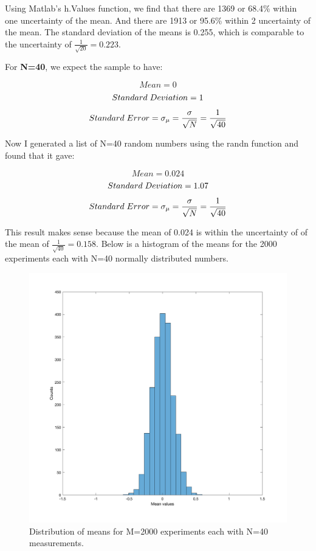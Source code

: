 \documentclass{article}
\begin{document}
  Using Matlab’s h.Values function, we find that there are 1369 or 68.4\% within one uncertainty of the mean. And there are 1913 or 95.6\% within 2 uncertainty of the mean. The standard deviation of the means is 0.255, which is comparable to the uncertainty of $\frac{1}{\sqrt{20}}=0.223$.  \newline
  
  For \textbf{N=40}, we expect the sample to have:
 
 \[ Mean=0\]
  \[ Standard\hspace{1mm}Deviation=1\]
   \[ Standard\hspace{1mm}Error=\sigma_{\mu}=\frac{\sigma}{\sqrt{N}}=\frac{1}{\sqrt{40}}\] 


Now I generated a list of N=40 random numbers using the randn function and found that it gave:

 \[ Mean=0.024\]
  \[ Standard\hspace{1mm}Deviation=1.07\]
   \[ Standard\hspace{1mm}Error=\sigma_{\mu}=\frac{\sigma}{\sqrt{N}}=\frac{1}{\sqrt{40}}\] 
   
   This result makes sense because the mean of 0.024 is within the uncertainty of of the mean of $\frac{1}{\sqrt{40}}=0.158$. Below is a histogram of the means for the 2000 experiments each with N=40 normally distributed numbers.
 

   \begin{figure}[H]
  \centering
  \includegraphics[width=0.8\linewidth]{lateximages/Prob3_4_40.png}
  \caption{Distribution of means for M=2000 experiments each with N=40 measurements.}
  \label{fig:boat1}
  \end{figure}
  
\end{document}
